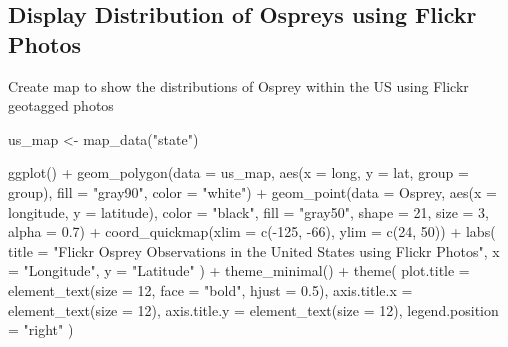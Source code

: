 \documentclass[
  letterpaper,
  DIV=11,
  numbers=noendperiod]{scrartcl}
\newenvironment{Shaded}{\begin{snugshade}}{\end{snugshade}}
\newcommand{\AttributeTok}[1]{\textcolor[rgb]{0.40,0.45,0.13}{#1}}
\newcommand{\DecValTok}[1]{\textcolor[rgb]{0.68,0.00,0.00}{#1}}
\newcommand{\FloatTok}[1]{\textcolor[rgb]{0.68,0.00,0.00}{#1}}
\newcommand{\FunctionTok}[1]{\textcolor[rgb]{0.28,0.35,0.67}{#1}}
\newcommand{\NormalTok}[1]{\textcolor[rgb]{0.00,0.23,0.31}{#1}}
\newcommand{\OtherTok}[1]{\textcolor[rgb]{0.00,0.23,0.31}{#1}}
\newcommand{\SpecialCharTok}[1]{\textcolor[rgb]{0.37,0.37,0.37}{#1}}
\newcommand{\StringTok}[1]{\textcolor[rgb]{0.13,0.47,0.30}{#1}}
\begin{document}
\subsection{Display Distribution of Ospreys using Flickr
Photos}\label{display-distribution-of-ospreys-using-flickr-photos}

Create map to show the distributions of Osprey within the US using
Flickr geotagged photos

\begin{Shaded}
\begin{Highlighting}[]
\NormalTok{us\_map }\OtherTok{\textless{}{-}} \FunctionTok{map\_data}\NormalTok{(}\StringTok{"state"}\NormalTok{) }

\FunctionTok{ggplot}\NormalTok{() }\SpecialCharTok{+}
  \FunctionTok{geom\_polygon}\NormalTok{(}\AttributeTok{data =}\NormalTok{ us\_map, }\FunctionTok{aes}\NormalTok{(}\AttributeTok{x =}\NormalTok{ long, }\AttributeTok{y =}\NormalTok{ lat, }\AttributeTok{group =}\NormalTok{ group),}
               \AttributeTok{fill =} \StringTok{"gray90"}\NormalTok{, }\AttributeTok{color =} \StringTok{"white"}\NormalTok{) }\SpecialCharTok{+}
  \FunctionTok{geom\_point}\NormalTok{(}\AttributeTok{data =}\NormalTok{ Osprey, }\FunctionTok{aes}\NormalTok{(}\AttributeTok{x =}\NormalTok{ longitude, }\AttributeTok{y =}\NormalTok{ latitude), }
             \AttributeTok{color =} \StringTok{"black"}\NormalTok{, }\AttributeTok{fill =} \StringTok{"gray50"}\NormalTok{, }\AttributeTok{shape =} \DecValTok{21}\NormalTok{, }\AttributeTok{size =} \DecValTok{3}\NormalTok{, }\AttributeTok{alpha =} \FloatTok{0.7}\NormalTok{) }\SpecialCharTok{+}
  \FunctionTok{coord\_quickmap}\NormalTok{(}\AttributeTok{xlim =} \FunctionTok{c}\NormalTok{(}\SpecialCharTok{{-}}\DecValTok{125}\NormalTok{, }\SpecialCharTok{{-}}\DecValTok{66}\NormalTok{), }\AttributeTok{ylim =} \FunctionTok{c}\NormalTok{(}\DecValTok{24}\NormalTok{, }\DecValTok{50}\NormalTok{)) }\SpecialCharTok{+}
  \FunctionTok{labs}\NormalTok{(}
    \AttributeTok{title =} \StringTok{"Flickr Osprey Observations in the United States using Flickr Photos"}\NormalTok{,}
    \AttributeTok{x =} \StringTok{"Longitude"}\NormalTok{,}
    \AttributeTok{y =} \StringTok{"Latitude"}
\NormalTok{  ) }\SpecialCharTok{+}
  \FunctionTok{theme\_minimal}\NormalTok{() }\SpecialCharTok{+}
  \FunctionTok{theme}\NormalTok{(}
    \AttributeTok{plot.title =} \FunctionTok{element\_text}\NormalTok{(}\AttributeTok{size =} \DecValTok{12}\NormalTok{, }\AttributeTok{face =} \StringTok{"bold"}\NormalTok{, }\AttributeTok{hjust =} \FloatTok{0.5}\NormalTok{),}
    \AttributeTok{axis.title.x =} \FunctionTok{element\_text}\NormalTok{(}\AttributeTok{size =} \DecValTok{12}\NormalTok{),}
    \AttributeTok{axis.title.y =} \FunctionTok{element\_text}\NormalTok{(}\AttributeTok{size =} \DecValTok{12}\NormalTok{),}
    \AttributeTok{legend.position =} \StringTok{"right"}
\NormalTok{  )}
\end{Highlighting}
\end{Shaded}
\end{document}
